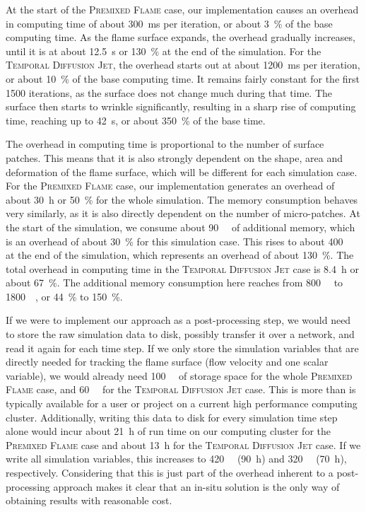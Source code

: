 %
At the start of the \textsc{Premixed Flame} case, our implementation causes an
overhead in computing time of about \SI{300}{\milli\second} per iteration, or
about \SI{3}{\percent} of the base computing time.
%
As the flame surface expands, the overhead gradually increases, until it is at
about \SI{12.5}{\second} or \SI{130}{\percent} at the end of the simulation.
%
For the \textsc{Temporal Diffusion Jet}, the overhead starts out at about
\SI{1200}{\milli\second} per iteration, or about \SI{10}{\percent} of the base
computing time.
%
It remains fairly constant for the first \num{1500} iterations, as the surface
does not change much during that time.
%
The surface then starts to wrinkle significantly, resulting in a sharp rise of
computing time, reaching up to \SI{42}{\second}, or about \SI{350}{\percent} of
the base time.
%

%
The overhead in computing time is proportional to the number of surface patches.
%
This means that it is also strongly dependent on the shape, area and deformation
of the flame surface, which will be different for each simulation case.
%
For the \textsc{Premixed Flame} case, our implementation generates an overhead
of about \SI{30}{\hour} or \SI{50}{\percent} for the whole simulation.
%
The memory consumption behaves very similarly, as it is also directly dependent
on the number of micro-patches.
%
At the start of the simulation, we consume about \SI{90}{\giga\byte} of
additional memory, which is an overhead of about \SI{30}{\percent} for this
simulation case.
%
This rises to about \SI{400}{\giga\byte} at the end of the simulation, which
represents an overhead of about \SI{130}{\percent}.
%
The total overhead in computing time in the \textsc{Temporal Diffusion
Jet} case is \SI{8.4}{\hour} or about \SI{67}{\percent}.
%
The additional memory consumption here reaches from \SI{800}{\giga\byte} to
\SI{1800}{\giga\byte}, or \SI{44}{\percent} to \SI{150}{\percent}.
%

%
If we were to implement our approach as a post-processing step, we would need to
store the raw simulation data to disk, possibly transfer it over a network, and
read it again for each time step.
%
If we only store the simulation variables that are directly needed for tracking
the flame surface (flow velocity and one scalar variable), we would already need
\SI{100}{\tera\byte} of storage space for the whole \textsc{Premixed Flame}
case, and \SI{60}{\tera\byte} for the \textsc{Temporal Diffusion Jet} case.
%
This is more than is typically available for a user or project on a current high
performance computing cluster.
%
Additionally, writing this data to disk for every simulation time step alone
would incur about \SI{21}{\hour} of run time on our computing cluster for the
\textsc{Premixed Flame} case and about \SI{13}{\hour} for the \textsc{Temporal
Diffusion Jet} case.
%
If we write all simulation variables, this increases to \SI{420}{\tera\byte}
(\SI{90}{\hour}) and \SI{320}{\tera\byte} (\SI{70}{\hour}), respectively.
%
Considering that this is just part of the overhead inherent to a post-processing
approach makes it clear that an in-situ solution is the only way of obtaining
results with reasonable cost.
%

%
